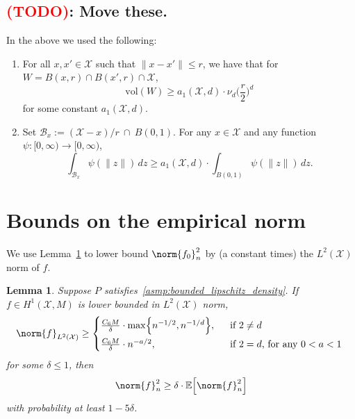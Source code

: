 \documentclass[twoside]{article}
\newcommand{\vol}{\text{vol}}
\newcommand{\1}{\mathbf{1}}
\newcommand{\Xset}{\mathcal{X}}
\newcommand{\Leb}{L}
\newcommand{\mc}[1]{\mathcal{#1}}
\newcommand{\Ebb}{\mathbb{E}}
\newtheorem{lemma}{Lemma}
\theoremstyle{definition}
\theoremstyle{remark}
\begin{document}
\subsection{\textcolor{red}{(TODO)}: Move these.}

In the above we used the following:
\begin{enumerate}[label=(OT\arabic*)]
	\item
	\label{asmp:r_small_1} For all $x,x' \in \Xset$ such that $\|x - x'\| \leq r$, we have that for $W = B(x,r) \cap B(x',r) \cap \Xset$,
	\begin{equation*}
	\vol(W) \geq a_1(\Xset,d) \cdot \nu_d \biggl(\frac{r}{2}\biggr)^d
	\end{equation*}
	for some constant $a_1(\Xset,d)$. 
	\item 
	\label{asmp:r_small_3} Set $\mc{B}_x:= (\Xset - x)/r~ \cap~B(0,1)$. For any $x \in \Xset$ and any function $\psi: [0,\infty) \to [0,\infty)$,
	\begin{equation}
	\label{eqn:lb_expected_degree}
	\int_{\mc{B}_x} \psi(\|z\|) \,dz \geq a_1(\Xset,d) \cdot \int_{B(0,1)} \psi(\|z\|) \,dz.
	\end{equation}
\end{enumerate}

\section{Bounds on the empirical norm}
\label{sec:empirical_norm}

We use Lemma~\ref{lem:empirical_norm_sobolev} to lower bound $\norm{f_0}_n^2$ by (a constant times) the $\Leb^2(\Xset)$ norm of $f$.

\begin{lemma}
	\label{lem:empirical_norm_sobolev}
	Suppose $P$ satisfies~\ref{asmp:bounded_lipschitz_density}. If $f \in H^1(\Xset,M)$ is lower bounded in $\Leb^2(\Xset)$ norm,
	\begin{equation}
	\label{eqn:empirical_norm_sobolev_1}
	\norm{f}_{\Leb^2(\Xset)} \geq 
	\begin{cases*}
	\frac{C_6 M}{\delta} \cdot \max\Bigl\{n^{-1/2},n^{-1/d}\Bigr\},& ~~\textrm{if $2 \neq d$} \\
	\frac{C_6 M}{\delta} \cdot n^{-a/2},& ~~\textrm{if $2 = d$, for any $0 < a < 1$}
	\end{cases*}
	\end{equation}
	for some $\delta \leq 1$, then
	\begin{equation}
	\label{eqn:empirical_norm_sobolev}
	\norm{f}_n^2 \geq \delta \cdot \Ebb\Bigl[\norm{f}_n^2\Bigr] 
	\end{equation}
	with probability at least $1 - 5 \delta$.
\end{lemma}
\end{document}
